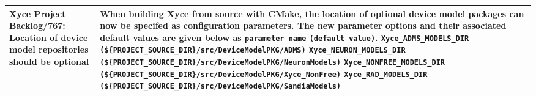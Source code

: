 {\begin{longtable}[h] {>{\raggedright\small}m{2in}|>{\raggedright\let\\\tabularnewline\small}m{3.5in}}
\textbf{Xyce Project Backlog/767}: Location of device model repositories 
should be optional & When building Xyce from source with CMake, the 
location of optional device model packages can now be specifed as 
configuration parameters. The new parameter options and their 
associated default values are given below as \texttt{parameter name} 
\texttt{(default value)}. \newline
\texttt{Xyce\_ADMS\_MODELS\_DIR} \texttt{(\$\{PROJECT\_SOURCE\_DIR\}/src/DeviceModelPKG/ADMS)} \newline
\texttt{Xyce\_NEURON\_MODELS\_DIR} \texttt{(\$\{PROJECT\_SOURCE\_DIR\}/src/DeviceModelPKG/NeuronModels)} \newline
\texttt{Xyce\_NONFREE\_MODELS\_DIR} \texttt{(\$\{PROJECT\_SOURCE\_DIR\}/src/DeviceModelPKG/Xyce\_NonFree)} \newline
\texttt{Xyce\_RAD\_MODELS\_DIR} \texttt{(\$\{PROJECT\_SOURCE\_DIR\}/src/DeviceModelPKG/SandiaModels)} \newline
\\ \hline

\end{longtable}
}
